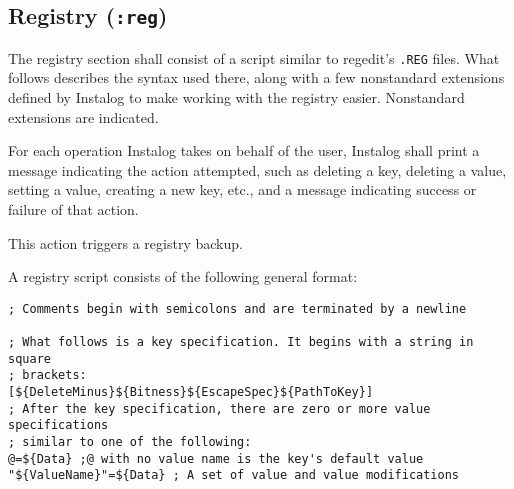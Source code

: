 \subsection{Registry (\texttt{:reg})}
The registry section shall consist of a script similar to regedit's \verb|.REG|
files. What follows describes the syntax used there, along with a few
nonstandard extensions defined by Instalog to make working with the registry
easier. Nonstandard extensions are indicated.

For each operation Instalog takes on behalf of the user, Instalog shall print a
message indicating the action attempted, such as deleting a key, deleting a
value, setting a value, creating a new key, etc., and a message indicating
success or failure of that action.

This action triggers a registry backup.

A registry script consists of the following general format:
\begin{verbatim}
; Comments begin with semicolons and are terminated by a newline

; What follows is a key specification. It begins with a string in square
; brackets:
[${DeleteMinus}${Bitness}${EscapeSpec}${PathToKey}]
; After the key specification, there are zero or more value specifications
; similar to one of the following:
@=${Data} ;@ with no value name is the key's default value
"${ValueName}"=${Data} ; A set of value and value modifications
\end{verbatim}

